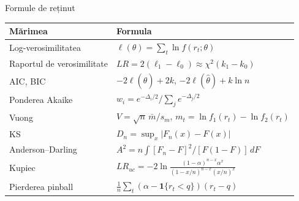 \begin{frame}{Formule de reținut}
\itemsize{\small}
{\renewcommand{\arraystretch}{1.4}\begin{center}
\footnotesize
\begin{tabular}{ll}
\toprule
\textbf{Mărimea} & \textbf{Formula} \\
\midrule
Log-verosimilitatea & $\ell(\theta) = \sum_t \ln f(r_t; \theta)$ \\
Raportul de verosimilitate & $LR = 2(\ell_1 - \ell_0) \approx \chi^2(k_1 - k_0)$ \\
AIC, BIC & $-2\ell(\hat\theta) + 2k$, \quad $-2\ell(\hat\theta) + k\ln n$ \\
Ponderea Akaike & $w_i = e^{-\Delta_i/2} / \sum_j e^{-\Delta_j/2}$ \\
Vuong & $V = \sqrt{n}\,\bar m / s_m$, \quad $m_t = \ln f_1(r_t) - \ln f_2(r_t)$ \\
KS & $D_n = \sup_x |F_n(x) - F(x)|$ \\
Anderson--Darling & $A^2 = n\int [F_n - F]^2 / [F(1 - F)]\, dF$ \\
Kupiec & $LR_{uc} = -2\ln\frac{(1-\alpha)^{n - x}\alpha^x}{(1 - x/n)^{n - x}(x/n)^x}$ \\
Pierderea pinball & $\frac{1}{n}\sum_t (\alpha - \mathbf{1}\{r_t < q\})(r_t - q)$ \\
\bottomrule
\end{tabular}
\end{center}
}
\end{frame}

